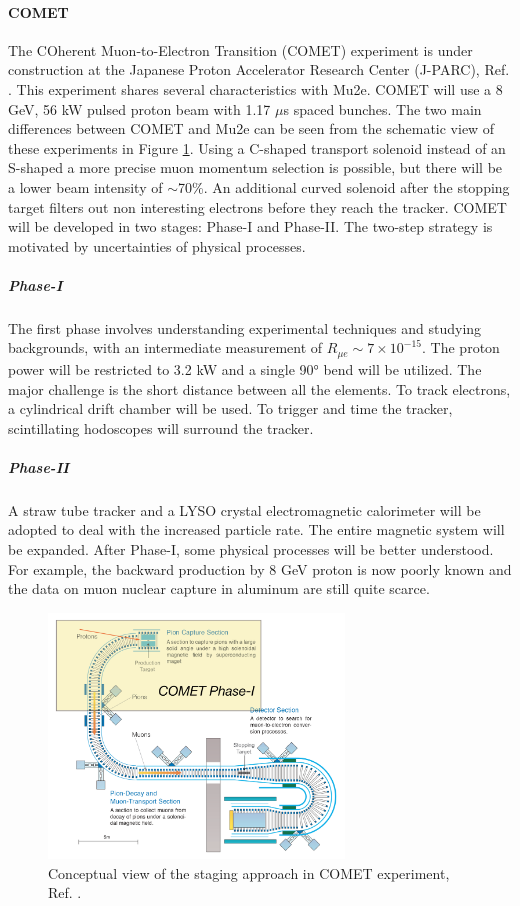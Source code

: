 \paragraph{COMET}
The COherent Muon-to-Electron Transition (COMET) experiment is under construction at
the Japanese Proton Accelerator Research Center (J-PARC), Ref. \cite{Abramishvili_2020}. 
This experiment shares several characteristics with Mu2e. COMET will use a 8 GeV, 56 kW pulsed proton beam
with 1.17 $\mu$s spaced bunches. The two main differences between
COMET and Mu2e can be seen from the schematic view of these experiments in Figure \ref{fig:comet}.
Using a C-shaped transport solenoid instead of an S-shaped a more precise muon momentum selection 
is possible, but there will be a lower beam intensity of $\sim$70\%.
An additional curved solenoid after the stopping target filters out non 
interesting electrons before they reach the tracker.
COMET will be developed in two stages: Phase-I and Phase-II. The two-step strategy is motivated by uncertainties of physical processes. 
\subparagraph*{Phase-I} The first phase involves understanding experimental techniques and studying backgrounds, 
with an intermediate measurement of $R_{\mu e} \sim 7\times 10^{-15}$. The proton power will be restricted to 
3.2 kW and a single 90° bend will be utilized. The major challenge is the short distance between all the elements. 
To track electrons, a cylindrical drift chamber will be used. To trigger and time the tracker, 
scintillating hodoscopes will surround the tracker. 
\subparagraph*{Phase-II} A straw tube tracker and a LYSO crystal electromagnetic 
calorimeter will be adopted to deal with the increased particle rate. 
The entire magnetic system will be  expanded.
After Phase-I, some physical processes will be better understood.
For example, the backward production by 8 GeV proton is now poorly known and the data on muon nuclear
capture in aluminum are still quite scarce. 
\begin{figure}[!h]
\centering
\includegraphics[width =0.7\textwidth]{figures/png/Screenshot_20240307_152133.png}
\caption{Conceptual view of the staging approach in COMET experiment, Ref. \cite{Abramishvili_2020}.}
\label{fig:comet}
\end{figure}
